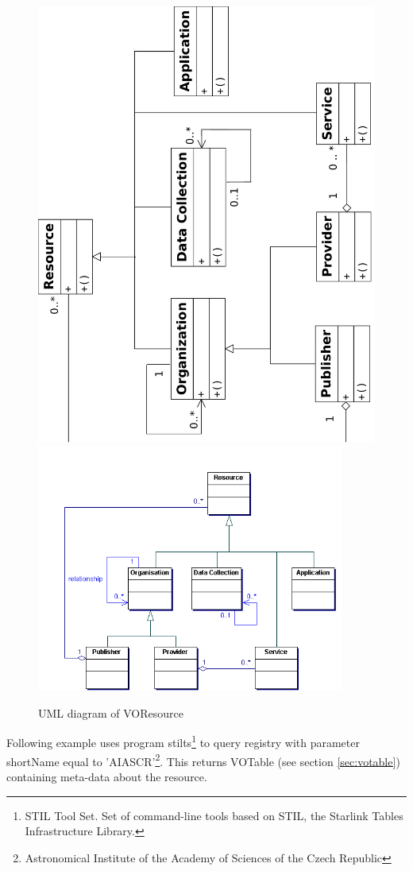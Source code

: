     \begin{figure}[!htbp]
      \begin{center}
        \leavevmode
        \ifpdf
        \includegraphics[height=0.8\textwidth, angle=-90]{resources}
        \else
        \includegraphics[width=0.9\textwidth]{resource.png}
        \fi
      \end{center}
        \caption{UML diagram of VOResource}
        \label{FigResource}
    \end{figure}


Following example uses program stilts\footnote{STIL Tool Set. Set of
  command-line tools based on STIL, the Starlink Tables Infrastructure
  Library.} to query registry with parameter shortName equal to
'AIASCR'\footnote{Astronomical Institute of the Academy of Sciences of
  the Czech Republic}. This returns VOTable (see section
\ref{sec:votable}) containing meta-data about the resource.

